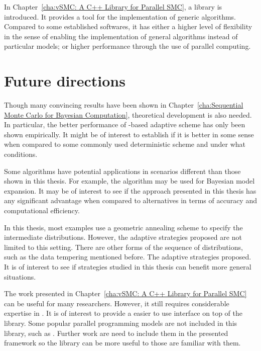 In Chapter~\ref{cha:vSMC: A C++ Library for Parallel SMC}, a \cpp library is
introduced. It provides a tool for the implementation of generic \smc
algorithms. Compared to some established softwares, it has either a higher
level of flexibility in the sense of enabling the implementation of general
algorithms instead of particular models; or higher performance through the use
of parallel computing.

\section{Future directions}
\label{sec:Further directions}

Though many convincing results have been shown in Chapter~\ref{cha:Sequential
  Monte Carlo for Bayesian Computation}, theoretical development is also
needed. In particular, the better performance of \cess-based adaptive scheme
has only been shown empirically. It might be of interest to establish if it is
better in some sense when compared to some commonly used deterministic
scheme and under what conditions.

Some algorithms have potential applications in scenarios different than those
shown in this thesis. For example, the \smc[3] algorithm may be used for
Bayesian model expansion. It may be of interest to see if the approach
presented in this thesis has any significant advantage when compared to
alternatives in terms of accuracy and computational efficiency.

In this thesis, most examples use a geometric annealing scheme to specify the
intermediate distributions. However, the adaptive strategies proposed are not
limited to this setting. There are other forms of the sequence of
distributions, such as the data tempering mentioned before. The adaptive
strategies proposed. It is of interest to see if strategies studied in this
thesis can benefit more general situations.

The work presented in Chapter~\ref{cha:vSMC: A C++ Library for Parallel SMC}
can be useful for many researchers. However, it still requires considerable
expertise in \cpp. It is of interest to provide a easier to use interface on
top of the library. Some popular parallel programming models are not included
in this library, such as \cuda \cite{cuda}. Further work are need to include
them in the presented framework so the library can be more useful to those are
familiar with them.
